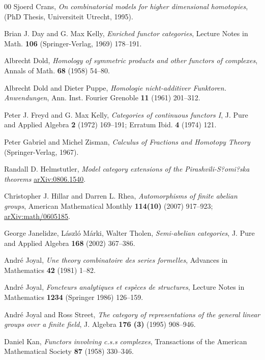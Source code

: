 \documentclass[a4paper,12pt,reqno]{amsart}
\theoremstyle{definition}
\theoremstyle{fact}
\theoremstyle{genquest}
\theoremstyle{step}
\begin{document}
\begin{thebibliography}{00}
 Sjoerd Crans, \textit{On combinatorial models for higher dimensional homotopies}, (PhD Thesis, Universiteit Utrecht, 1995).\label{CransThesis}

 Brian J. Day and G. Max Kelly, \textit{Enriched functor categories}, 
Lecture Notes in Math. \textbf{106} (Springer-Verlag, 1969) 178--191.\label{efc}

 Albrecht Dold, \textit{Homology of symmetric products and other functors of complexes}, Annals of Math. \textbf{68} (1958) 54--80.\label{Dold}
 
 Albrecht Dold and Dieter Puppe, \textit{Homologie nicht-additiver Funktoren. Anwendungen}, Ann. Inst. Fourier Grenoble \textbf{11} (1961) 201--312.\label{DoldPuppe}

 Peter J. Freyd and G. Max Kelly, \textit{Categories of continuous functors I}, J. Pure and Applied Algebra \textbf{2} (1972) 169--191; Erratum Ibid. \textbf{4} (1974) 121.\label{FreydKelly}

 Peter Gabriel and Michel Zisman, \textit{Calculus of Fractions and Homotopy Theory} (Springer-Verlag, 1967).\label{GabZis} 

 Randall D. Helmstutler, \textit{Model category extensions of the Pirashvili-S?omi?ska theorems} \url{arXiv:0806.1540}.\label{Helm}

 Christopher J. Hillar and Darren L. Rhea, \textit{Automorphisms of finite abelian groups}, American Mathematical Monthly \textbf{114(10)} (2007) 917--923; \url{arXiv:math/0605185}.\label{HillarDarren2007}

 George Janelidze, L\'aszl\'o M\'arki, Walter Tholen, \textit{Semi-abelian categories}, J. Pure and Applied Algebra \textbf{168} (2002) 367--386.\label{JMT}

 Andr\'e Joyal, \textit{Une theory combinatoire des series formelles}, Advances in Mathematics \textbf{42} (1981) 1--82.\label{Species}

 Andr\'e Joyal, \textit{Foncteurs analytiques et esp\`eces de structures}, Lecture Notes in Mathematics \textbf{1234} (Springer 1986) 126--159.\label{AnalFunct} 

 Andr\'e Joyal and Ross Street, \textit{The category of representations of the general linear groups over a finite field}, J. Algebra \textbf{176 (3)} (1995) 908--946.\label{repfgl}

 Daniel Kan, \textit{Functors involving c.s.s complexes}, Transactions of the American Mathematical Society \textbf{87} (1958) 330--346.\label{Kan}


\end{thebibliography}
\end{document}
